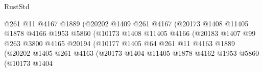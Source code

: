 \begin{lexlean}{RustStd}
\begin{coremodule}
{\begin{coremodule}
{{{{{{{{{{{{{{{{{{{{{{{{{{{{{                                            @261
                                            @11
                                            @4167
                                            @1889
                                            (@20202
                                              @1409
                                              @261
                                              @4167
                                              (@20173
                                                @1408
                                                @11405
                                                @1878
                                                @4166
                                                @1953
                                                @5860
                                                (@10173
                                                  @1408
                                                  @11405
                                                  @4166
                                                  (@20183
                                                    @1407
                                                    @99
                                                    @263
                                                    @3800
                                                    @4165
                                                    @20194
                                                    (@10177
                                                      @1405
                                                      @64
                                                      @261
                                                      @11
                                                      @4163
                                                      @1889
                                                      (@20202
                                                        @1405
                                                        @261
                                                        @4163
                                                        (@20173
                                                          @1404
                                                          @11405
                                                          @1878
                                                          @4162
                                                          @1953
                                                          @5860
                                                          (@10173
                                                            @1404
}}}}}}}}}}}}}}}}}}}}}}}}}}}}}
\end{coremodule}}
\end{coremodule}
\end{lexlean}

